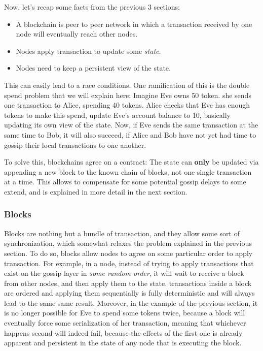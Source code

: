Now, let's recap some facts from the previous 3 sections:

\begin{itemize}
	\item A blockchain is peer to peer network in which a transaction received by one node will
	eventually reach other nodes.
	\item Nodes apply transaction to update some \textit{state}.
	\item Nodes need to keep a persistent view of the state.
\end{itemize}

This can easily lead to a race conditions. One ramification of this is the double spend problem that
we will explain here: Imagine Eve owns 50 token. she sends one transaction to Alice, spending 40
tokens. Alice checks that Eve has enough tokens to make this spend, update Eve's account balance to
10, basically updating its own view of the state. Now, if Eve sends the same transaction at the same
time to Bob, it will also succeed, if Alice and Bob have not yet had time to gossip their local
transactions to one another.

To solve this, blockchains agree on a contract: The state can \textbf{only} be updated via appending
a new block to the known chain of blocks, not one single transaction at a time. This allows to
compensate for some potential gossip delays to some extend, and is explained in more detail in the
next section.

\subsubsection{Blocks} \label{chap_bg:subsec:block}

Blocks are nothing but a bundle of transaction, and they allow some sort of synchronization, which
somewhat relaxes the problem explained in the previous section. To do so, blocks allow nodes to
agree on some particular order to apply transaction. For example, in a node, instead of trying to
apply transactions that exist on the gossip layer in \textit{some random order}, it will wait to
receive a block from other nodes, and then apply them to the state. transactions inside a block are
ordered and applying them sequentially is fully deterministic and will always lead to the same same
result. Moreover, in the example of the previous section, it is no longer possible for Eve to spend
some tokens twice, because a block will eventually force some serialization of her transaction,
meaning that whichever happens second will indeed fail, because the effects of the first one is
already apparent and persistent in the state of any node that is executing the block.

